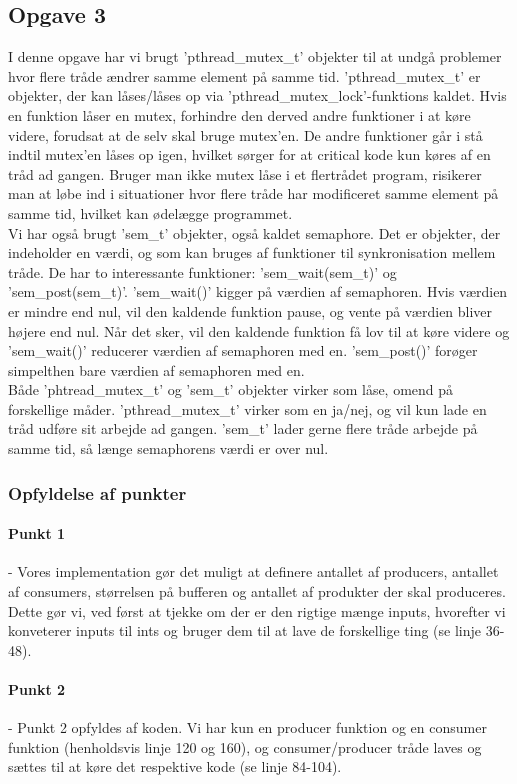 {\subsection{Opgave 3}
\label{O3}
I denne opgave har vi brugt 'pthread_mutex_t' objekter til at undgå problemer hvor flere tråde ændrer samme element på samme tid. 'pthread_mutex_t' er objekter, der kan låses/låses op via 'pthread_mutex_lock'-funktions kaldet. Hvis en funktion låser en mutex, forhindre den derved andre funktioner i at køre videre, forudsat at de selv skal bruge mutex'en. De andre funktioner går i stå indtil mutex'en låses op igen, hvilket sørger for at critical kode kun køres af en tråd ad gangen. Bruger man ikke mutex låse i et flertrådet program, risikerer man at løbe ind i situationer hvor flere tråde har modificeret samme element på samme tid, hvilket kan ødelægge programmet.
\\ Vi har også brugt 'sem_t' objekter, også kaldet semaphore. Det er objekter, der indeholder en værdi, og som kan bruges af funktioner til synkronisation mellem tråde. De har to interessante funktioner: 'sem_wait(sem_t)' og 'sem_post(sem_t)'. 'sem_wait()' kigger på værdien af semaphoren. Hvis værdien er mindre end nul, vil den kaldende funktion pause, og vente på værdien bliver højere end nul. Når det sker, vil den kaldende funktion få lov til at køre videre og 'sem_wait()' reducerer værdien af semaphoren med en. 'sem_post()' forøger simpelthen bare værdien af semaphoren med en.
\\ Både 'phtread_mutex_t' og 'sem_t' objekter virker som låse, omend på forskellige måder. 'pthread_mutex_t' virker som en ja/nej, og vil kun lade en tråd udføre sit arbejde ad gangen. 'sem_t' lader gerne flere tråde arbejde på samme tid, så længe semaphorens værdi er over nul.

\subsubsection{Opfyldelse af punkter}
\label{O3_Punkter}
\paragraph{Punkt 1} - Vores implementation gør det muligt at definere antallet af producers, antallet af consumers, størrelsen på bufferen og antallet af produkter der skal produceres. Dette gør vi, ved først at tjekke om der er den rigtige mænge inputs, hvorefter vi konveterer inputs til ints og bruger dem til at lave de forskellige ting (se linje 36-48).
\paragraph{Punkt 2} - Punkt 2 opfyldes af koden. Vi har kun en producer funktion og en consumer funktion (henholdsvis linje 120 og 160), og consumer/producer tråde laves og sættes til at køre det respektive kode (se linje 84-104).
}
